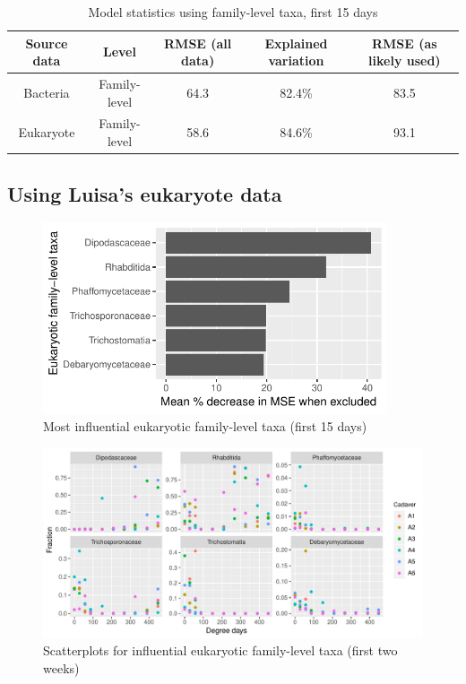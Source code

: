 \documentclass{article}
\begin{document}
\begin{table}
  \centering
\caption{\label{tbl:family_first_two_weeks_model_stats}Model statistics using family-level taxa, first 15 days}
\begin{tabular}{ccccc}
Source data & Level & RMSE (all data) & Explained variation & RMSE (as likely used)\\ \hline
Bacteria  & Family-level & 64.3 & 82.4\% & 83.5\\
Eukaryote & Family-level & 58.6 & 84.6\% & 93.1 %
\end{tabular}
\end{table}



\subsection{Using Luisa's eukaryote data}

\begin{figure}
  \centering
  \includegraphics[width=4in]{../eukaryote_data/only_families/first_two_weeks/hit_1perc_twice/orig_units_first_two_weeks_families_PercIncMSE_barchart}
  \caption{Most influential eukaryotic family-level taxa (first 15 days)}
  \label{fig:infl_euk_first_15_days_family_taxa}
\end{figure}
\begin{figure}
  \centering
  \includegraphics[width=7.5in]{../eukaryote_data/only_families/first_two_weeks/hit_1perc_twice/infl_euk_family_first_two_weeks_scatter}
  \caption{Scatterplots for influential eukaryotic family-level taxa (first two weeks)}
  \label{fig:infl_euk_first_15_days_family_scatter}
\end{figure}
\end{document}
